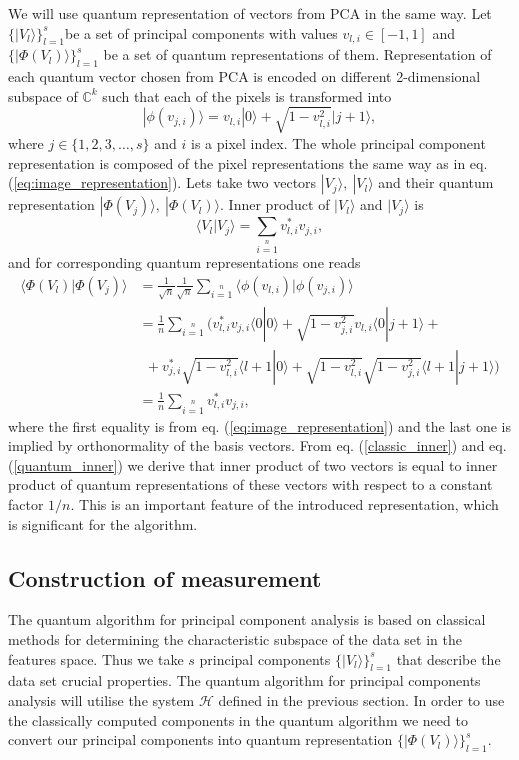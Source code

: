 \documentclass[a4paper,10pt]{llncs}
\newcommand{\ket}[1]{| #1 \rangle}
\newcommand{\bra}[1]{\langle #1 |}
\newcommand{\braket}[2]{\bra{#2}{#1}\rangle}
\newcommand{\1}{\mathbb{1}}
\begin{document}
We will use quantum representation of vectors from PCA in the same way. Let 
$\{\ket{V_l}\}_{l=1}^s$be a set of principal components with values $v_{l,i}\in 
[-1,1]$ and $\{\ket{\Phi(V_l)}\}_{l=1}^s$ be a set of quantum representations 
of them.
Representation of each quantum vector chosen from PCA is encoded on different 
2-dimensional
subspace of $\mathbb{C}^k$ such that each of the pixels is transformed into
\begin{equation}
\ket{\phi{(v_{j,i})}}=v_{l,i}\ket{0}+\sqrt{1-v_{l,i}^2}\ket{j+1},
\end{equation}
where $j\in \{1,2,3, \ldots, s\}$ and $i$ is a pixel index. The whole 
principal component representation is composed of the pixel representations the 
same way as in eq. (\ref{eq:image_representation}).  Lets take two 
vectors
$\ket{V_{j}},\ \ket{V_{l}}$ and their quantum representation $\ket{\Phi(V_j)},\
\ket{\Phi(V_l)}$. Inner product of $\ket{V_l}$ and $\ket{V_j}$ is
\begin{equation}
\braket{V_j}{V_l}=\sum\limits_{i=1}\limits^nv_{l,i}^*v_{j,i}, 
\label{classic_inner}
\end{equation}
and for corresponding quantum representations one reads
\begin{equation}
\begin{split}
\braket{\Phi(V_j)}{\Phi(V_l)}
&=\frac{1}{\sqrt{n}}\frac{1}{\sqrt{n}}
\sum\limits_{i=1}\limits^n\braket{\phi(v_{j,i})}{\phi(v_{l,i})}\\
&=\frac{1}{n}\sum\limits_{i=1}\limits^n(v_{l,i}^*v_{j,i}\braket{0}{0}+\sqrt{1-v_{j,i}^2}v_{l,i}\braket{j+1}{0}+\\
&\phantom{\ \ }+v_{j,i}^*\sqrt{1-v_{l,i}^2}\braket{0}{l+1}+\sqrt{1-v_{l,i}^2}\sqrt{1-v_{j,i}^2}\braket{j+1}{l+1})\\
&=\frac{1}{n}\sum\limits_{i=1}\limits^nv_{l,i}^*v_{j,i},
\end{split} \label{quantum_inner}
\end{equation}
where the first equality is from eq. (\ref{eq:image_representation}) and the 
last one is implied by orthonormality of the basis vectors.
From eq. (\ref{classic_inner}) and eq. (\ref{quantum_inner}) we derive that inner product of two vectors is equal to inner product of quantum representations of these vectors with respect to a constant factor $1/n $. This is an important feature of the introduced representation, which is significant for the algorithm.
\subsection{Construction of measurement}
The quantum algorithm for principal component analysis is based on classical 
methods for determining the characteristic subspace of the data set in the 
features space.
Thus we take $s$ principal components $\{\ket{V_l}\}_{l=1}^s$ that describe the 
data set crucial properties. 
The quantum algorithm for principal components analysis will utilise the system 
$\mathcal{H}$ defined in the previous section.
In order to use the classically computed 
components in the quantum algorithm we need to convert our principal components 
into quantum representation $\{\ket{\Phi{(V_l)}}\}_{l=1}^s$.
\end{document}
